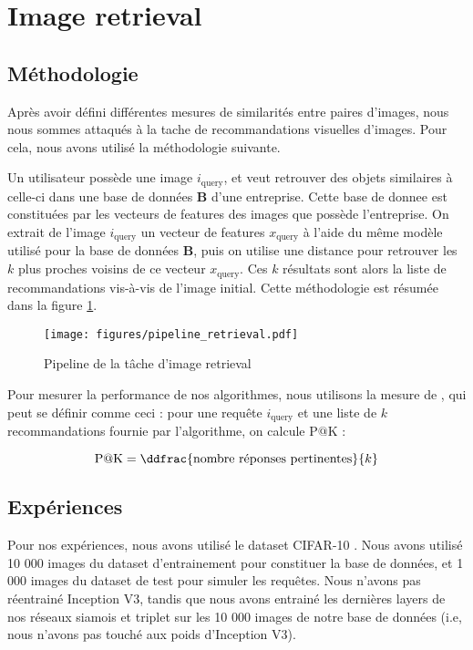 \section{Image retrieval}

\subsection{Méthodologie}

Après avoir défini différentes mesures de similarités entre paires d'images, nous nous sommes attaqués à la tache de
recommandations visuelles d'images. Pour cela, nous avons utilisé la méthodologie suivante.


Un utilisateur possède une image $i_{\text{query}}$, et veut retrouver des objets similaires à celle-ci dans une base de
données $\bm{B}$ d'une entreprise. Cette base de donnee est constituées par les vecteurs de features des images que
possède l'entreprise. On extrait de l'image $i_{\text{query}}$ un vecteur de features $x_{\text{query}}$ à l'aide du
même modèle utilisé pour la base de données $\bm{B}$, puis on utilise une distance pour retrouver les $k$ plus proches
voisins de ce vecteur $x_{\text{query}}$. Ces $k$ résultats sont alors la liste de recommandations vis-à-vis de l'image
initial. Cette méthodologie est résumée dans la figure \ref{fig:pipeline_retrieval}.

\begin{figure}[ht]
    \center
    \texttt{[image: figures/pipeline\_retrieval.pdf]}
    \caption{Pipeline de la tâche d'image retrieval \label{fig:pipeline_retrieval}}
\end{figure}

Pour mesurer la performance de nos algorithmes, nous utilisons la mesure de  \cite{visual2017zhai},
qui peut se définir comme ceci : pour une requête $i_{\text{query}}$ et une liste de $k$ recommandations fournie par
l'algorithme, on calcule $\text{P@K}$ :

\begin{equation}
    \text{P@K} = \ddfrac{\text{nombre réponses pertinentes}}{k}
\end{equation}

\subsection{Expériences}

Pour nos expériences, nous avons utilisé le dataset CIFAR-10 \cite{learning2009krizhevsky}. Nous avons utilisé 10 000
images du dataset d'entrainement pour constituer la base de données, et 1 000 images du dataset de test pour simuler les
requêtes. Nous n'avons pas réentrainé Inception V3, tandis que nous avons entrainé les dernières layers de nos réseaux
siamois et triplet sur les 10 000 images de notre base de données (i.e, nous n'avons pas touché aux poids d'Inception
V3).

